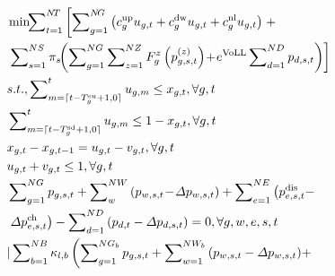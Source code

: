 \documentclass[lettersize,journal]{IEEEtran}
\newenvironment{newsubequations}{\small\begin{subequations}}{\end{subequations}}
\begin{document}
\vspace{-0.125in}
\begin{newsubequations}\label{eqn:20}
	\begin{align}
		 & \min\!\!\sum\nolimits_{t=1}^{N\!T}\left[ \sum\nolimits_{g=1}^{N\!G}\left( c_{g}^{\text{up}} u_{g,t} +  c_{g}^{\text{dw}} u_{g,t} +  c_{g}^{\text{nl}} u_{g,t}\right)\right. + \label{20-a}                                  \\
		 & \left. \sum\nolimits_{s = 1}^{NS} \pi_{s} \!\!\left(\sum\nolimits_{g=1}^{NG}\sum\nolimits_{z = 1}^{NZ}F_{g}^{z}\left(p_{g,s,t}^{(z)}\right) \!+\! e^{\text{VoLL}}\sum\nolimits_{d = 1}^{ND} p_{d,s,t}\right)\right]\!\notag \\
		 & s.t., \sum\nolimits_{m=\lceil t - T_{g}^{\text{su}} + 1, 0\rceil}^{t} u_{g,m} \leq x_{g,t}, \forall g, t \label{20-b}                                                                                                       \\
		 & \sum\nolimits_{m=\lceil t - T_{g}^{\text{sd}} + 1, 0\rceil}^{t} u_{g,m} \leq 1 - x_{g,t}, \forall g, t \label{20-c}                                                                                                         \\
		 & x_{g,t} - x_{g,t-1} = u_{g,t} - v_{g,t}, \forall g, t \label{20-d}                                                                                                                                                          \\
		 & u_{g,t} + v_{g,t} \leq 1, \forall g, t \label{20-e}                                                                                                                                                                         \\
		 & \sum\nolimits_{g =1}^{NG} p_{g,s,t} + \sum\nolimits_{w}^{NW} \left(p_{w,s,t}\! -\! \varDelta p_{w,s,t}\right) + \sum\nolimits_{e = 1}^{NE} \left(p_{e,s,t}^{\text{dis}} - \right. \notag                                    \\
		 & \left.\varDelta p_{e,s,t}^{\text{ch}}\right) -\sum\nolimits_{d=1}^{ND}\left(p_{d,t} - \varDelta p_{d,s,t}\right) = 0, \forall g, w, e, s, t \label{20-f}                                                                    \\
		 & \vert \sum\nolimits_{b = 1}^{NB} \kappa_{l,b}\left( \sum\nolimits_{g = 1}^{NG_b} p_{g,s,t} + \sum\nolimits_{w =1}^{NW_b} \left( p_{w,s,t} - \varDelta p_{w,s,t}\right)  \!+ \! \right. \label{20-g}                         \\

\end{align}
\end{newsubequations}
\end{document}
